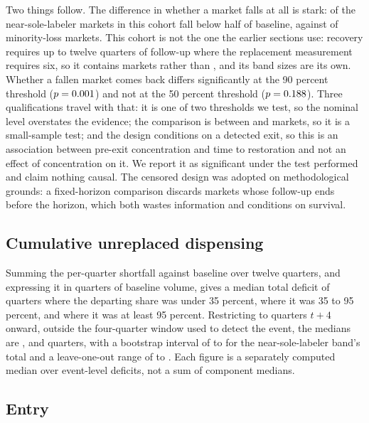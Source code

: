 \documentclass[pdflatex,sn-vancouver-num,Numbered]{sn-jnl}
\begin{document}
Two things follow. The difference in whether a market falls at all is stark: \nCrossSole of the
\nCrossSoleOf near-sole-labeler markets in this cohort fall below half of baseline, against
\nCrossMinor of \nCrossMinorOf minority-loss markets. This cohort is not the one the earlier
sections use: recovery requires up to twelve quarters of follow-up where the replacement measurement
requires six, so it contains \nCrossCohort markets rather than \nCohort, and its band sizes are
its own.
Whether a fallen market comes back differs significantly at the 90 percent threshold
($p=0.001$) and not at the 50 percent threshold ($p=0.188$). Three
qualifications travel with that: it is one of two thresholds we test, so the nominal level
overstates the evidence; the comparison is between \nCrossSoleOf and \nCrossMinorOf markets, so
it is a small-sample test; and the design conditions on a detected exit, so this is an
association between pre-exit concentration and time to restoration and not an effect of
concentration on it. We report it as significant under the test performed and claim nothing
causal. The censored design was adopted on
methodological grounds: a fixed-horizon comparison discards markets whose follow-up ends before
the horizon, which both wastes information and conditions on survival.

\subsection{Cumulative unreplaced dispensing}\label{subsec:deficit}

Summing the per-quarter shortfall against baseline over twelve quarters, and expressing it in
quarters of baseline volume, gives a median total deficit of \nDefTotLo quarters where the
departing share was under 35 percent, \nDefTotMid where it was 35 to 95 percent, and
\nDefTotSole where it was at least 95 percent. Restricting to quarters $t+4$ onward, outside the
four-quarter window used to detect the event, the medians are \nDefPostLo, \nDefPostMid and
\nDefPostSole quarters, with a bootstrap interval of \nDefSoleCiLo to \nDefSoleCiHi for the
near-sole-labeler band's total and a leave-one-out range of \nDefSoleLooLo to \nDefSoleLooHi. Each figure is a separately computed
median over event-level deficits, not a sum of component medians.

\subsection{Entry}\label{subsec:entry}
\end{document}
